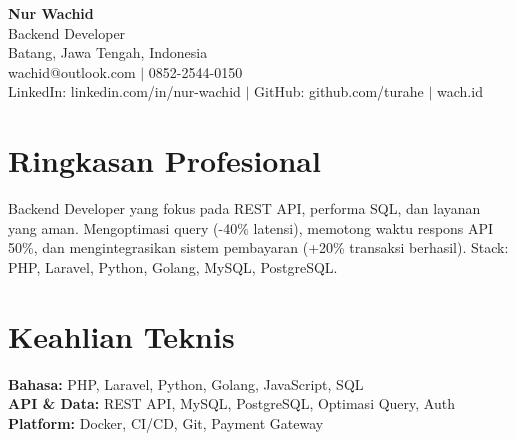 \begin{center}
  {\LARGE\bfseries Nur Wachid}\\[3pt]
  Backend Developer\\[2pt]
  Batang, Jawa Tengah, Indonesia\\[2pt]
  wachid@outlook.com $|$ 0852-2544-0150\\[1pt]
  LinkedIn: linkedin.com/in/nur-wachid $|$ GitHub: github.com/turahe $|$ wach.id
\end{center}
\section*{Ringkasan Profesional}
Backend Developer yang fokus pada REST API, performa SQL, dan layanan yang aman. Mengoptimasi query (-40\% latensi), memotong waktu respons API 50\%, dan mengintegrasikan sistem pembayaran (+20\% transaksi berhasil). Stack: PHP, Laravel, Python, Golang, MySQL, PostgreSQL.
\section*{Keahlian Teknis}
\textbf{Bahasa:} PHP, Laravel, Python, Golang, JavaScript, SQL\\[1pt]
\textbf{API \& Data:} REST API, MySQL, PostgreSQL, Optimasi Query, Auth\\[1pt]
\textbf{Platform:} Docker, CI/CD, Git, Payment Gateway

